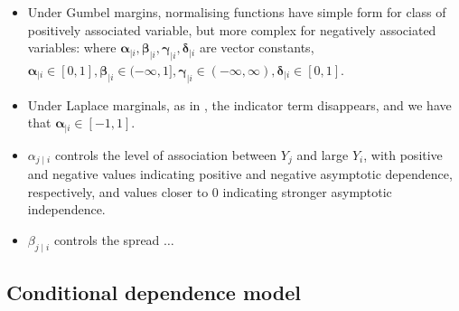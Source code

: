 \documentclass{article}
\numberwithin{equation}{section}
\begin{document}
\begin{itemize}
  \item Under Gumbel margins, normalising functions have simple form for class of positively associated variable, but more complex for negatively associated variables:
    where $\bm{\alpha}_{\mid i}, \bm{\beta}_{\mid i}, \bm{\gamma}_{\mid i}, \bm{\delta}_{\mid i}$ are vector constants, $\bm{\alpha}_{\mid i} \in [0, 1], \bm{\beta}_{\mid i} \in (-\infty, 1], \bm{\gamma}_{\mid i} \in (-\infty, \infty) , \bm{\delta}_{\mid i} \in [0, 1]$. 
  \item Under Laplace marginals, as in \cite{Keef2013}, the indicator term disappears, and we have that $\bm{\alpha}_{\mid i} \in [-1, 1]$. 
  \item $\alpha_{j \mid i}$ controls the level of association between $Y_j$ and large $Y_i$, with positive and negative values indicating positive and negative asymptotic dependence, respectively, and values closer to 0 indicating stronger asymptotic independence. 
  \item $\beta_{j \mid i}$ controls the spread $\ldots$ 
\end{itemize}


\subsection{Conditional dependence model}
\end{document}
